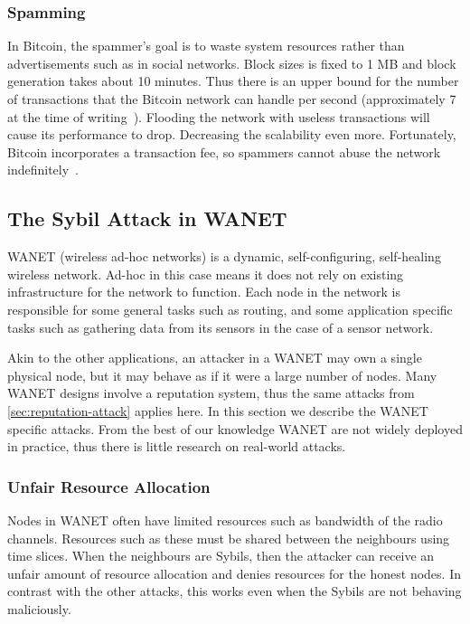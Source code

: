 \subsubsection{Spamming}
In Bitcoin, the spammer's goal is to waste system resources rather than
advertisements such as in social networks. Block sizes is fixed to 1 MB and
block generation takes about 10 minutes. Thus there is an upper bound for the
number of transactions that the Bitcoin network can handle per second
(approximately 7 at the time of writing~\cite{bitcointps}). Flooding the network
with useless transactions will cause its performance to drop. Decreasing the
scalability even more. Fortunately, Bitcoin incorporates a transaction fee, so
spammers cannot abuse the network indefinitely~\cite{bitcoinspam}.

\subsection{The Sybil Attack in WANET}
WANET (wireless ad-hoc networks) is a dynamic, self-configuring, self-healing
wireless network. Ad-hoc in this case means it does not rely on existing
infrastructure for the network to function. Each node in the network is
responsible for some general tasks such as routing, and some application
specific tasks such as gathering data from its sensors in the case of a sensor
network.

Akin to the other applications, an attacker in a WANET may own a single physical
node, but it may behave as if it were a large number of nodes. Many WANET
designs involve a reputation system\cite{ganeriwal2008reputation,
  buchegger2003robust}, thus the same attacks from
\autoref{sec:reputation-attack} applies here. In this section we describe the
WANET specific attacks. From the best of our knowledge WANET are not widely
deployed in practice, thus there is little research on real-world attacks.

\subsubsection{Unfair Resource Allocation}
Nodes in WANET often have limited resources such as bandwidth of the radio
channels. Resources such as these must be shared between the neighbours using
time slices. When the neighbours are Sybils, then the attacker can receive an
unfair amount of resource allocation and denies resources for the honest
nodes\cite{newsome2004sybil}. In contrast with the other attacks, this works
even when the Sybils are not behaving maliciously.

